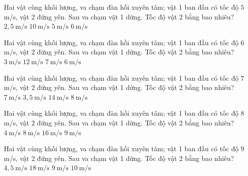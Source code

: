 \begin{ex}
Hai vật cùng khối lượng, va chạm đàn hồi xuyên tâm; vật 1 ban đầu có tốc độ $5$ m/s, vật 2 đứng yên. Sau va chạm vật 1 dừng. Tốc độ vật 2 bằng bao nhiêu?
\choice
{$2,5\ \mathrm{m/s}$}
{$10\ \mathrm{m/s}$}
{\True $5\ \mathrm{m/s}$}
{$6\ \mathrm{m/s}$}
\end{ex}

\begin{ex}
Hai vật cùng khối lượng, va chạm đàn hồi xuyên tâm; vật 1 ban đầu có tốc độ $6$ m/s, vật 2 đứng yên. Sau va chạm vật 1 dừng. Tốc độ vật 2 bằng bao nhiêu?
\choice
{$3\ \mathrm{m/s}$}
{$12\ \mathrm{m/s}$}
{$7\ \mathrm{m/s}$}
{\True $6\ \mathrm{m/s}$}
\end{ex}

\begin{ex}
Hai vật cùng khối lượng, va chạm đàn hồi xuyên tâm; vật 1 ban đầu có tốc độ $7$ m/s, vật 2 đứng yên. Sau va chạm vật 1 dừng. Tốc độ vật 2 bằng bao nhiêu?
\choice
{\True $7\ \mathrm{m/s}$}
{$3,5\ \mathrm{m/s}$}
{$14\ \mathrm{m/s}$}
{$8\ \mathrm{m/s}$}
\end{ex}

\begin{ex}
Hai vật cùng khối lượng, va chạm đàn hồi xuyên tâm; vật 1 ban đầu có tốc độ $8$ m/s, vật 2 đứng yên. Sau va chạm vật 1 dừng. Tốc độ vật 2 bằng bao nhiêu?
\choice
{$4\ \mathrm{m/s}$}
{\True $8\ \mathrm{m/s}$}
{$16\ \mathrm{m/s}$}
{$9\ \mathrm{m/s}$}
\end{ex}

\begin{ex}
Hai vật cùng khối lượng, va chạm đàn hồi xuyên tâm; vật 1 ban đầu có tốc độ $9$ m/s, vật 2 đứng yên. Sau va chạm vật 1 dừng. Tốc độ vật 2 bằng bao nhiêu?
\choice
{$4,5\ \mathrm{m/s}$}
{$18\ \mathrm{m/s}$}
{\True $9\ \mathrm{m/s}$}
{$10\ \mathrm{m/s}$}
\end{ex}


